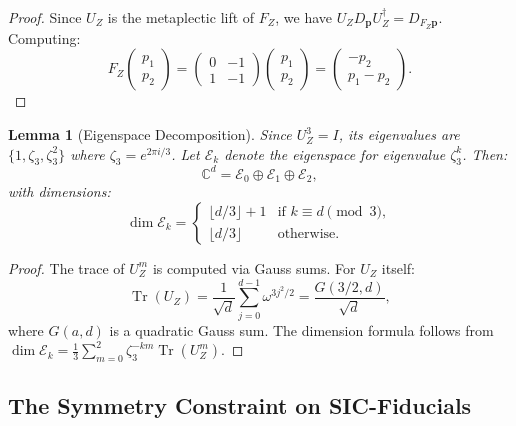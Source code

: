 \documentclass[a4paper,11pt]{article}
\newtheorem{lemma}[theorem]{Lemma}
\DeclareMathOperator{\Tr}{Tr}
\newcommand{\C}{\mathbb{C}}
\begin{document}
\begin{proof}
Since $U_Z$ is the metaplectic lift of $F_Z$, we have $U_Z D_\mathbf{p} U_Z^\dagger = D_{F_Z \mathbf{p}}$. Computing:
\begin{equation}
F_Z \begin{pmatrix} p_1 \\ p_2 \end{pmatrix} = \begin{pmatrix} 0 & -1 \\ 1 & -1 \end{pmatrix} \begin{pmatrix} p_1 \\ p_2 \end{pmatrix} = \begin{pmatrix} -p_2 \\ p_1 - p_2 \end{pmatrix}.
\end{equation}
\end{proof}

\begin{lemma}[Eigenspace Decomposition]\label{lem:eigenspace}
Since $U_Z^3 = I$, its eigenvalues are $\{1, \zeta_3, \zeta_3^2\}$ where $\zeta_3 = e^{2\pi i/3}$. Let $\mathcal{E}_k$ denote the eigenspace for eigenvalue $\zeta_3^k$. Then:
\begin{equation}
\C^d = \mathcal{E}_0 \oplus \mathcal{E}_1 \oplus \mathcal{E}_2,
\end{equation}
with dimensions:
\begin{equation}
\dim \mathcal{E}_k = \begin{cases}
\lfloor d/3 \rfloor + 1 & \text{if } k \equiv d \pmod 3, \\
\lfloor d/3 \rfloor & \text{otherwise}.
\end{cases}
\end{equation}
\end{lemma}

\begin{proof}
The trace of $U_Z^m$ is computed via Gauss sums. For $U_Z$ itself:
\begin{equation}
\Tr(U_Z) = \frac{1}{\sqrt{d}} \sum_{j=0}^{d-1} \omega^{3j^2/2} = \frac{G(3/2, d)}{\sqrt{d}},
\end{equation}
where $G(a,d)$ is a quadratic Gauss sum. The dimension formula follows from $\dim \mathcal{E}_k = \frac{1}{3}\sum_{m=0}^{2} \zeta_3^{-km} \Tr(U_Z^m)$.
\end{proof}

\subsection{The Symmetry Constraint on SIC-Fiducials}
\end{document}
